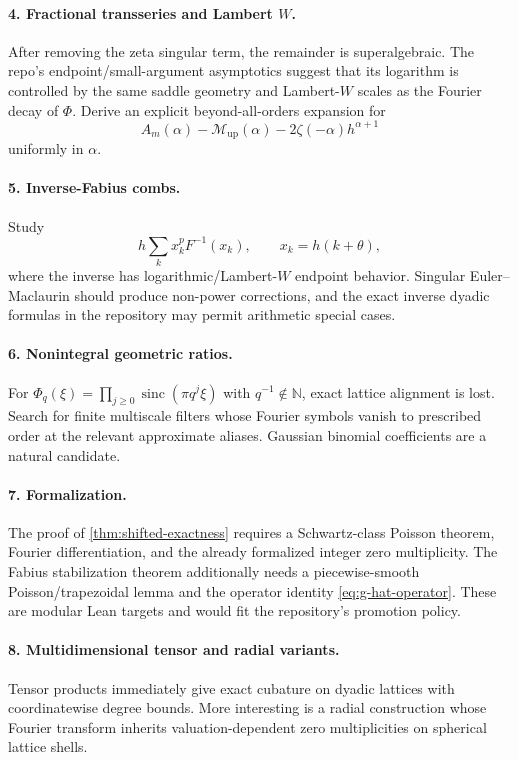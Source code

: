 \documentclass[11pt]{article}
\theoremstyle{definition}
\DeclareMathOperator{\sinc}{sinc}
\newcommand{\Up}{\operatorname{up}}
\newcommand{\N}{\mathbb{N}}
\newcommand{\Mell}{\mathcal{M}}
\begin{document}
\paragraph{4. Fractional transseries and Lambert $W$.}
After removing the zeta singular term, the remainder is superalgebraic.  The
repo's endpoint/small-argument asymptotics suggest that its logarithm is
controlled by the same saddle geometry and Lambert-$W$ scales as the Fourier
decay of $\Phi$.  Derive an explicit beyond-all-orders expansion for
\[
 A_m(\alpha)-\Mell_{\Up}(\alpha)-2\zeta(-\alpha)h^{\alpha+1}
\]
uniformly in $\alpha$.

\paragraph{5. Inverse-Fabius combs.}
Study
\[
 h\sum_{k}x_k^pF^{-1}(x_k),\qquad x_k=h(k+\theta),
\]
where the inverse has logarithmic/Lambert-$W$ endpoint behavior.  Singular
Euler--Maclaurin should produce non-power corrections, and the exact inverse
dyadic formulas in the repository may permit arithmetic special cases.

\paragraph{6. Nonintegral geometric ratios.}
For
$\Phi_q(\xi)=\prod_{j\ge0}\sinc(\pi q^j\xi)$ with $q^{-1}\notin\N$, exact
lattice alignment is lost.  Search for finite multiscale filters whose
Fourier symbols vanish to prescribed order at the relevant approximate
aliases.  Gaussian binomial coefficients are a natural candidate.

\paragraph{7. Formalization.}
The proof of \cref{thm:shifted-exactness} requires a Schwartz-class Poisson
theorem, Fourier differentiation, and the already formalized integer zero
multiplicity.  The Fabius stabilization theorem additionally needs a
piecewise-smooth Poisson/trapezoidal lemma and the operator identity
\eqref{eq:g-hat-operator}.  These are modular Lean targets and would fit the
repository's promotion policy.

\paragraph{8. Multidimensional tensor and radial variants.}
Tensor products immediately give exact cubature on dyadic lattices with
coordinatewise degree bounds.  More interesting is a radial construction
whose Fourier transform inherits valuation-dependent zero multiplicities on
spherical lattice shells.
\end{document}

